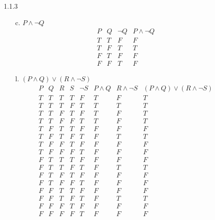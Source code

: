 \documentclass[11pt]{amsart}
\theoremstyle{definition}
\begin{document}
\begin{itemize}
\begin{itemize}
\end{itemize}

\item[1.1.3]
\begin{itemize}

    \item[c.]
    $P \land \neg Q$
    \begin{equation*}
    \begin{array}{cccc}
        P & Q & \neg Q & P \land \neg Q \\
        T & T & F & F \\
        T & F & T & T \\
        F & T & F & F \\
        F & F & T & F
    \end{array}
    \end{equation*}

    \item[l.]
    $(P \land Q) \lor (R \land \neg S)$
    \begin{equation*}
    \begin{array}{cccccccc}
        P & Q & R & S & \neg S & P\land Q & R \land \neg S & (P \land Q) \lor (R \land \neg S) \\
        T & T & T & T & F & T & F & T \\
        T & T & T & F & T & T & T & T \\
        T & T & F & T & F & T & F & T \\
        T & T & F & F & T & T & F & T \\
        T & F & T & T & F & F & F & F \\
        T & F & T & F & T & F & T & T \\
        T & F & F & T & F & F & F & F \\
        T & F & F & F & T & F & F & F \\
        F & T & T & T & F & F & F & F \\
        F & T & T & F & T & F & T & T \\
        F & T & F & T & F & F & F & F \\
        F & T & F & F & T & F & F & F \\
        F & F & T & T & F & F & F & F \\
        F & F & T & F & T & F & T & T \\
        F & F & F & T & F & F & F & F \\
        F & F & F & F & T & F & F & F \\
    \end{array}
    \end{equation*}
    

\end{itemize}
\end{itemize}
\end{document}
